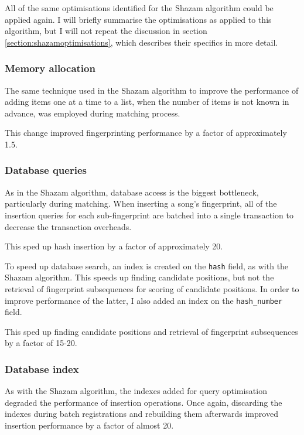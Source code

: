 \documentclass[12pt,a4paper,twoside,openright]{report}
\begin{document}
All of the same optimisations identified for the Shazam algorithm could be applied again. I will briefly summarise the optimisations as applied to this algorithm, but I will not repeat the discussion in section \ref{section:shazamoptimisations}, which describes their specifics in more detail.


\subsubsection{Memory allocation}

The same technique used in the Shazam algorithm to improve the performance of adding items one at a time to a list, when the number of items is not known in advance, was employed during matching process.

This change improved fingerprinting performance by a factor of approximately 1.5.

\subsubsection{Database queries}

As in the Shazam algorithm, database access is the biggest bottleneck, particularly during matching. When inserting a song's fingerprint, all of the insertion queries for each sub-fingerprint are batched into a single transaction to decrease the transaction overheads. 

This sped up hash insertion by a factor of approximately 20.

To speed up database search, an index is created on the \lstinline{hash} field, as with the Shazam algorithm. This speeds up finding candidate positions, but not the retrieval of fingerprint subsequences for scoring of candidate positions. In order to improve performance of the latter, I also added an index on the \lstinline{hash_number} field.

This sped up finding candidate positions and retrieval of fingerprint subsequences by a factor of 15-20.


\subsubsection{Database index}

As with the Shazam algorithm, the indexes added for query optimisation degraded the performance of insertion operations. Once again, discarding the indexes during batch registrations and rebuilding them afterwards improved insertion performance by a factor of almost 20.
\end{document}
